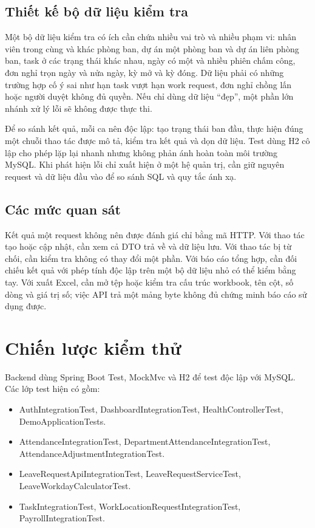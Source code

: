 \documentclass[12pt,a4paper,oneside]{report}
\begin{document}
\subsection{Thiết kế bộ dữ liệu kiểm tra}
Một bộ dữ liệu kiểm tra có ích cần chứa nhiều vai trò và nhiều phạm vi: nhân viên trong cùng và khác phòng ban, dự án một phòng ban và dự án liên phòng ban, task ở các trạng thái khác nhau, ngày có một và nhiều phiên chấm công, đơn nghỉ trọn ngày và nửa ngày, kỳ mở và kỳ đóng. Dữ liệu phải có những trường hợp cố ý sai như hạn task vượt hạn work request, đơn nghỉ chồng lấn hoặc người duyệt không đủ quyền. Nếu chỉ dùng dữ liệu ``đẹp'', một phần lớn nhánh xử lý lỗi sẽ không được thực thi.

Để so sánh kết quả, mỗi ca nên độc lập: tạo trạng thái ban đầu, thực hiện đúng một chuỗi thao tác được mô tả, kiểm tra kết quả và dọn dữ liệu. Test dùng H2 cô lập cho phép lặp lại nhanh nhưng không phản ánh hoàn toàn môi trường MySQL. Khi phát hiện lỗi chỉ xuất hiện ở một hệ quản trị, cần giữ nguyên request và dữ liệu đầu vào để so sánh SQL và quy tắc ánh xạ.

\subsection{Các mức quan sát}
Kết quả một request không nên được đánh giá chỉ bằng mã HTTP. Với thao tác tạo hoặc cập nhật, cần xem cả DTO trả về và dữ liệu lưu. Với thao tác bị từ chối, cần kiểm tra không có thay đổi một phần. Với báo cáo tổng hợp, cần đối chiếu kết quả với phép tính độc lập trên một bộ dữ liệu nhỏ có thể kiểm bằng tay. Với xuất Excel, cần mở tệp hoặc kiểm tra cấu trúc workbook, tên cột, số dòng và giá trị số; việc API trả một mảng byte không đủ chứng minh báo cáo sử dụng được.
\section{Chiến lược kiểm thử}
Backend dùng Spring Boot Test, MockMvc và H2 để test độc lập với MySQL. Các lớp test hiện có gồm:
\begin{itemize}
\item AuthIntegrationTest, DashboardIntegrationTest, HealthControllerTest, DemoApplicationTests.
\item AttendanceIntegrationTest, DepartmentAttendanceIntegrationTest, AttendanceAdjustmentIntegrationTest.
\item LeaveRequestApiIntegrationTest, LeaveRequestServiceTest, LeaveWorkdayCalculatorTest.
\item TaskIntegrationTest, WorkLocationRequestIntegrationTest, PayrollIntegrationTest.
\end{itemize}
\end{document}
